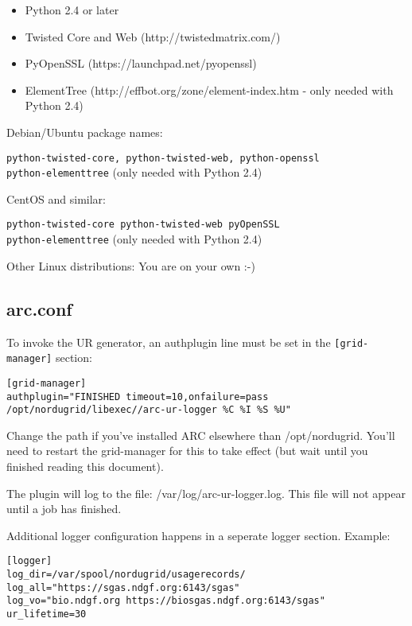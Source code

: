 \documentclass{article}
\begin{document}
\begin{itemize}
\item Python 2.4 or later
\item Twisted Core and Web (http://twistedmatrix.com/)
\item PyOpenSSL (https://launchpad.net/pyopenssl)
\item ElementTree (http://effbot.org/zone/element-index.htm - only needed with Python 2.4)
\end{itemize}

\noindent
Debian/Ubuntu package names:

\texttt{python-twisted-core, python-twisted-web, python-openssl} \\
\texttt{python-elementtree} (only needed with Python 2.4)

CentOS and similar:

\texttt{python-twisted-core python-twisted-web pyOpenSSL} \\
\texttt{python-elementtree} (only needed with Python 2.4)

Other Linux distributions: You are on your own :-)


\subsection{arc.conf}

To invoke the UR generator, an authplugin line must be set in the
\texttt{[grid-manager]} section:

\begin{verbatim}
[grid-manager]
authplugin="FINISHED timeout=10,onfailure=pass /opt/nordugrid/libexec//arc-ur-logger %C %I %S %U"
\end{verbatim}

Change the path if you've installed ARC elsewhere than /opt/nordugrid. You'll
need to restart the grid-manager for this to take effect (but wait until you
finished reading this document).

The plugin will log to the file: /var/log/arc-ur-logger.log. This file will not
appear until a job has finished.

Additional logger configuration happens in a seperate logger section. Example:

\begin{verbatim}
[logger]
log_dir=/var/spool/nordugrid/usagerecords/
log_all="https://sgas.ndgf.org:6143/sgas"
log_vo="bio.ndgf.org https://biosgas.ndgf.org:6143/sgas"
ur_lifetime=30
\end{verbatim}
\end{document}

